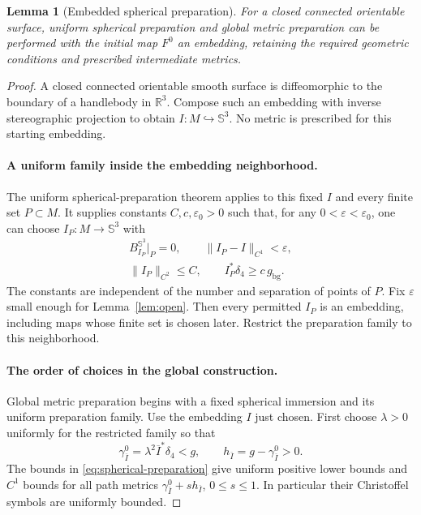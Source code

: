 \documentclass[11pt,a4paper]{article}
\newcommand{\R}{\mathbb R}
\newcommand{\Sph}{\mathbb S}
\newtheorem{lemma}[theorem]{Lemma}
\theoremstyle{definition}
\theoremstyle{remark}
\numberwithin{equation}{section}
\begin{document}
\begin{lemma}[Embedded spherical preparation]
\label{lem:preparation}
For a closed connected orientable surface, uniform spherical preparation
and global metric preparation can be performed with the initial map
$F^0$ an embedding, retaining the required geometric conditions and
prescribed intermediate metrics.
\end{lemma}
\begin{proof}
A closed connected orientable smooth surface is diffeomorphic to the
boundary of a handlebody in $\R^3$. Compose such an embedding with
inverse stereographic projection to obtain $I:M\hookrightarrow\Sph^3$.
No metric is prescribed for this starting embedding.

\paragraph{A uniform family inside the embedding neighborhood.}
The uniform spherical-preparation theorem applies to this fixed $I$ and every finite set
$P\subset M$. It supplies constants $C,c,\varepsilon_0>0$ such that,
for any $0<\varepsilon<\varepsilon_0$, one can choose $I_P:M\to\Sph^3$ with
\begin{equation}
 \begin{gathered}
 B^{\Sph^3}_{I_P}|_P=0,\qquad \|I_P-I\|_{C^1}<\varepsilon,\\
 \|I_P\|_{C^2}\le C,\qquad I_P^*\delta_4\ge c\,g_{\mathrm{bg}}.
 \end{gathered}
 \label{eq:spherical-preparation}
\end{equation}
The constants are independent of the number and separation of points
of $P$. Fix $\varepsilon$ small enough for Lemma~\ref{lem:open}.
Then every permitted $I_P$ is an embedding, including maps whose finite
set is chosen later. Restrict the preparation family to this neighborhood.

\paragraph{The order of choices in the global construction.}
Global metric preparation begins with a fixed spherical immersion and
its uniform preparation family. Use the embedding $I$ just chosen.
First choose $\lambda>0$ uniformly for the
restricted family so that
\[
 \gamma^0_{\overline I}=\lambda^2\overline I^*\delta_4<g,
 \qquad h_{\overline I}=g-\gamma^0_{\overline I}>0.
\]
The bounds in \eqref{eq:spherical-preparation} give uniform positive
lower bounds and $C^1$ bounds for all path metrics
$\gamma^0_{\overline I}+s h_{\overline I}$, $0\le s\le1$.
In particular their Christoffel symbols are uniformly bounded.


\end{proof}
\end{document}
